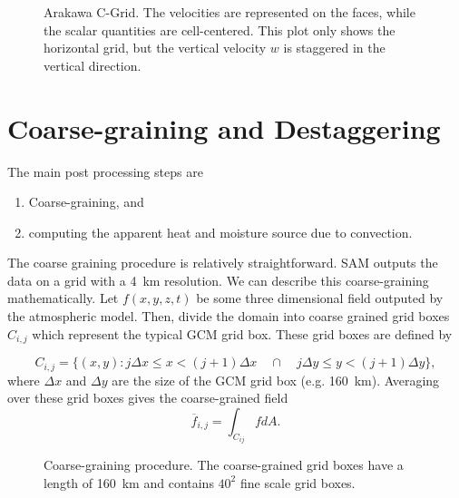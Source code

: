 \documentclass{report}
\begin{document}
\begin{figure}
  \centering


  \caption{Arakawa C-Grid. 
    The velocities are represented on the faces, while the scalar quantities are
    cell-centered. 
    This plot only shows the horizontal grid, but the vertical velocity $w$ is
    staggered in the vertical direction.}
  \label{fig:arakawa-c-grid}
\end{figure}


\section{Coarse-graining and Destaggering}
\label{sec:post-processing}

The main post processing steps are

\begin{enumerate}
\item Coarse-graining, and 
\item computing the apparent heat and moisture source due to convection.
\end{enumerate}

The coarse graining procedure is relatively straightforward. 
SAM outputs the data on a grid with a \SI{4}{\km} resolution. 
We can describe this coarse-graining mathematically. 
Let $f(x,y,z,t)$ be some three dimensional field outputed by the atmospheric
model. 
Then, divide the domain into coarse grained grid boxes $C_{i,j}$ which represent the
typical GCM grid box. These grid boxes are defined by

\[
  C_{i,j} = \{(x,y):   j \Delta x \leq x < (j+1) \Delta x
  \quad \cap\quad j \Delta y \leq y < (j+1) \Delta y \},
\]
where $\Delta x$ and $\Delta y$ are the size of the GCM grid box (e.g.
\SI{160}{\km}). Averaging over these grid boxes gives the coarse-grained field
\[
  \overline{f}_{i,j} = \int_{C_{ij}} f dA.
\]

\begin{figure}
  \centering
  \caption{Coarse-graining procedure. The coarse-grained grid boxes have a
    length of \SI{160}{km} and contains $40^2$ fine scale grid boxes.}
  \label{fig:coarse-grain}
\end{figure}
\end{document}
